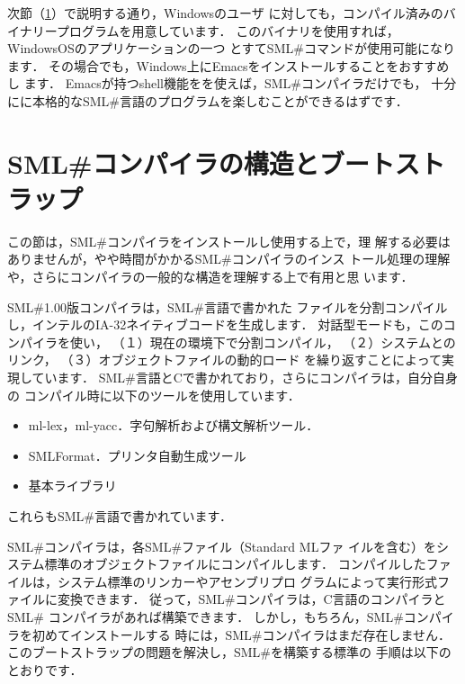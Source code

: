 \documentclass{jbook}
\newcommand{\smlsharp}{SML\#}
\newcommand{\version}{1.00}
\begin{document}
	次節（\ref{sec:tutorialInstall}）で説明する通り，Windowsのユーザ
に対しても，コンパイル済みのバイナリープログラムを用意しています．
	このバイナリを使用すれば，WindowsOSのアプリケーションの一つ
とすて\smlsharp{}コマンドが使用可能になります．
	その場合でも，Windows上にEmacsをインストールすることをおすすめし
ます．
	Emacsが持つshell機能をを使えば，\smlsharp{}コンパイラだけでも，
十分にに本格的な\smlsharp{}言語のプログラムを楽しむことができるはずです．

\section{\smlsharp{}コンパイラの構造とブートストラップ}
\label{sec:tutorialInstall}

	この節は，\smlsharp{}コンパイラをインストールし使用する上で，理
解する必要はありませんが，やや時間がかかる\smlsharp{}コンパイラのインス
トール処理の理解や，さらにコンパイラの一般的な構造を理解する上で有用と思
います．

	\smlsharp{}\version{}版コンパイラは，\smlsharp{}言語で書かれた
ファイルを分割コンパイルし，インテルのIA-32ネイティブコードを生成します．
	対話型モードも，このコンパイラを使い，
（１）現在の環境下で分割コンパイル，
（２）システムとのリンク，
（３）オブジェクトファイルの動的ロード
を繰り返すことによって実現しています．
	\smlsharp{}言語とCで書かれており，さらにコンパイラは，自分自身の
コンパイル時に以下のツールを使用しています．
\begin{itemize}
\item ml-lex，ml-yacc．字句解析および構文解析ツール．
\item SMLFormat．プリンタ自動生成ツール
\item 基本ライブラリ
\end{itemize}
	これらも\smlsharp{}言語で書かれています．

	\smlsharp{}コンパイラは，各\smlsharp{}ファイル（Standard MLファ
イルを含む）をシステム標準のオブジェクトファイルにコンパイルします．
	コンパイルしたファイルは，システム標準のリンカーやアセンブリプロ
グラムによって実行形式ファイルに変換できます．
	従って，\smlsharp{}コンパイラは，C言語のコンパイラと\smlsharp{}
コンパイラがあれば構築できます．
	しかし，もちろん，\smlsharp{}コンパイラを初めてインストールする
時には，\smlsharp{}コンパイラはまだ存在しません．
	このブートストラップの問題を解決し，\smlsharp{}を構築する標準の
手順は以下のとおりです．
\end{document}

